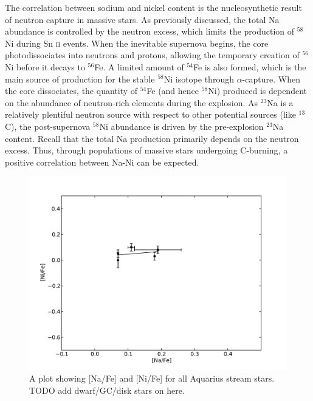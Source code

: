 \documentclass{emulateapj}
\begin{document}

The correlation between sodium and nickel content is the nucleosynthetic result of neutron capture in massive stars. As previously discussed, the total Na abundance is controlled by the neutron excess, which limits the production of $^{58}$Ni during Sn \textsc{ii} events. When the inevitable supernova begins, the core photodissociates into neutrons and protons, allowing the temporary creation of $^{56}$Ni before it decays to $^{56}$Fe. A limited amount of $^{54}$Fe is also formed, which is the main source of production for the stable $^{58}$Ni isotope through $\alpha$-capture. When the core dissociates, the quantity of $^{54}$Fe (and hence $^{58}$Ni) produced is dependent on the abundance of neutron-rich elements during the explosion. As $^{23}$Na is a relatively plentiful neutron source with respect to other potential sources (like $^{13}$C), the post-supernova $^{58}$Ni abundance is driven by the pre-explosion $^{23}$Na content. Recall that the total Na production primarily depends on the neutron excess. Thus, through populations of massive stars undergoing C-burning, a positive correlation between Na-Ni can be expected. 


\begin{figure}[h]
	\includegraphics[width=\columnwidth]{./figures/aquarius-na-ni.pdf}
	\caption{A plot showing [Na/Fe] and [Ni/Fe] for all Aquarius stream stars. TODO add dwarf/GC/disk stars on here.}
	\label{fig:na-ni}
\end{figure}
\end{document}
